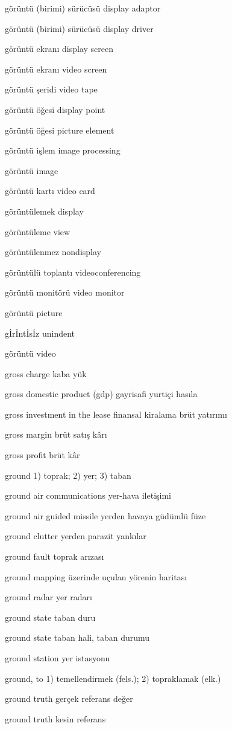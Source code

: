 \documentclass[12pt,fleqn]{article}\usepackage{../../common}
\begin{document}
görüntü (birimi) sürücüsü display adaptor

görüntü (birimi) sürücüsü display driver

görüntü ekranı display screen

görüntü ekranı video screen

görüntü şeridi video tape

görüntü öğesi display point

görüntü öğesi picture element

görüntü işlem image processing

görüntü image

görüntü kartı video card

görüntülemek display

görüntüleme view

görüntülenmez nondisplay

görüntülü toplantı videoconferencing

görüntü monitörü video monitor

görüntü picture

gİrİntİsİz unindent

görüntü video

gross charge kaba yük

gross domestic product (gdp) gayrisafi yurtiçi hasıla 

gross investment in the lease finansal kiralama brüt yatırımı

gross margin brüt satış kârı

gross profit brüt kâr

ground 1) toprak; 2) yer; 3) taban

ground air communications yer-hava iletişimi

ground air guided missile yerden havaya güdümlü füze

ground clutter yerden parazit yankılar

ground fault toprak arızası

ground mapping üzerinde uçulan yörenin haritası

ground radar yer radarı

ground state taban duru

ground state taban hali, taban durumu

ground station yer istasyonu

ground, to 1) temellendirmek (fels.); 2) topraklamak (elk.)

ground truth gerçek referans değer

ground truth kesin referans
\end{document}
